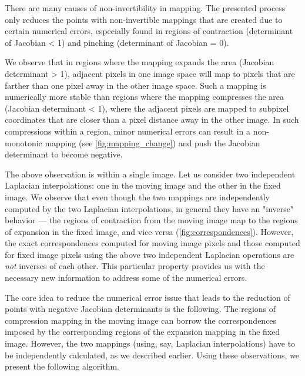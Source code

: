 There are many causes of non-invertibility in mapping. The presented process only reduces the points with non-invertible mappings that are created due to certain numerical errors, especially found in regions of contraction (determinant of Jacobian < 1) and pinching (determinant of Jacobian = 0).



 We observe that in regions where the mapping expands the area (Jacobian determinant > 1), adjacent pixels in one image space will map to pixels that are farther than one pixel away in the other image space. Such a mapping is numerically more stable than regions where the mapping compresses the area (Jacobian determinant < 1), where the adjacent pixels are mapped to subpixel coordinates that are closer than a pixel distance away in the other image. In such compressions within a region, minor numerical errors can result in a non-monotonic mapping (see \autoref{fig:mapping_change}) and push the Jacobian determinant to become negative. 

The above observation is within a single image. Let us consider two independent Laplacian interpolations: one in the moving image and the other in the fixed image. We observe that even though the two mappings are independently computed by the two Laplacian interpolations, in general they have an "inverse" behavior — the regions of contraction from the moving image map to the regions of expansion in the fixed image, and vice versa (\autoref{fig:correspondences}). However, the exact correspondences computed for moving image pixels and those computed for fixed image pixels using the above two independent Laplacian operations are {\em not} inverses of each other. This particular property provides us with the necessary new information to address some of the numerical errors. 

The core idea to reduce the numerical error issue that leads to the reduction of points with negative Jacobian determinants is the following. The regions of compression mapping in the moving image can borrow the correspondences imposed by the corresponding regions of the expansion mapping in the fixed image. However, the two mappings (using, say, Laplacian interpolations) have to be independently calculated, as we described earlier. Using these observations, we present the following algorithm.

